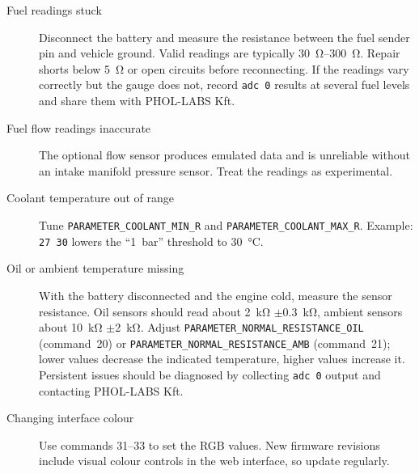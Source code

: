 \begin{description}
    \item[Fuel readings stuck] Disconnect the battery and measure the resistance between the fuel sender pin and vehicle ground. Valid readings are typically \SIrange{30}{300}{\ohm}. Repair shorts below \SI{5}{\ohm} or open circuits before reconnecting. If the readings vary correctly but the gauge does not, record \verb|adc 0| results at several fuel levels and share them with PHOL-LABS Kft.
    \item[Fuel flow readings inaccurate] The optional flow sensor produces emulated data and is unreliable without an intake manifold pressure sensor. Treat the readings as experimental.
    \item[Coolant temperature out of range] Tune \texttt{PARAMETER\_COOLANT\_MIN\_R} and \texttt{PARAMETER\_COOLANT\_MAX\_R}. Example: \verb|27 30| lowers the ``1~bar'' threshold to \SI{30}{\celsius}.
    \item[Oil or ambient temperature missing] With the battery disconnected and the engine cold, measure the sensor resistance. Oil sensors should read about \SI{2}{\kilo\ohm} \ensuremath{\pm}\SI{0.3}{\kilo\ohm}, ambient sensors about \SI{10}{\kilo\ohm} \ensuremath{\pm}\SI{2}{\kilo\ohm}. Adjust \texttt{PARAMETER\_NORMAL\_RESISTANCE\_OIL} (command~20) or \texttt{PARAMETER\_NORMAL\_RESISTANCE\_AMB} (command~21); lower values decrease the indicated temperature, higher values increase it. Persistent issues should be diagnosed by collecting \verb|adc 0| output and contacting PHOL-LABS Kft.
    \item[Changing interface colour] Use commands 31--33 to set the RGB values. New firmware revisions include visual colour controls in the web interface, so update regularly.
\end{description}
